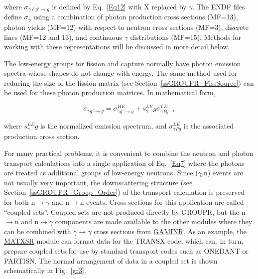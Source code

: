 \noindent
where $\sigma_{\gamma\ell g'\rightarrow g}$ is defined by
Eq.~\ref{Eq12} with X replaced by $\gamma$.  The ENDF files define
$\sigma_{\gamma}$ using a combination of photon production cross sections
(MF=13), photon yields (MF=12) with respect to neutron cross sections
(MF=3), discrete lines (MF=12 and 13), and continuous $\gamma$
distributions (MF=15).  Methods for working with these representations
will be discussed in more detail below.

The low-energy groups for fission and capture normally have photon
emission spectra whose shapes do not change with energy.  The same
method used for reducing the size of the fission matrix (see
Section~\ref{ssGROUPR_FissSource}) can be used for these photon production
matrices.  In mathematical form,

\begin{equation}
   \sigma_{\gamma g'{\rightarrow}g}=\sigma^{HE}_{\gamma g'{\rightarrow}g}
      + s^{LE}_\gamma g\sigma^{LE}_{\gamma Pg'} \,\,,
\end{equation}
\vspace{1 pt}

\noindent
where $s^{LE}_\gamma g$ is the normalized emission spectrum, and
$\sigma^{LE}_{\gamma Pg}$ is the associated production cross section.

For many practical problems, it is convenient to combine the neutron
and photon transport calculations into a single application of
Eq.~\ref{Eq7} where the photons are treated as additional groups of
low-energy neutrons.  Since ($\gamma$,n) events are not usually very
important, the downscattering structure
(see Section~\ref{ssGROUPR_Group_Order}) of the
transport calculation is preserved for both n${\rightarrow}\gamma$ and
n$\rightarrow$n events.  Cross sections for this application are called
``coupled sets''.  Coupled sets are not produced
directly by GROUPR, but the n$\rightarrow$n and n${\rightarrow}\gamma$
components are made available to the other modules where they can be
combined with $\gamma{\rightarrow}\gamma$ cross sections from
\hyperlink{sGAMINRhy}{GAMINR}.  As an example, the
\hyperlink{sMATXSRhy}{MATXSR} module
can format data for the TRANSX code, which can, in turn,
prepare coupled sets for use by standard transport codes such as
ONEDANT\cite{ONEDANT} or PARTISN\cite{PARTISN}.  The normal
arrangement of data in a coupled set is shown schematically
in Fig.~\ref{gr3}.

